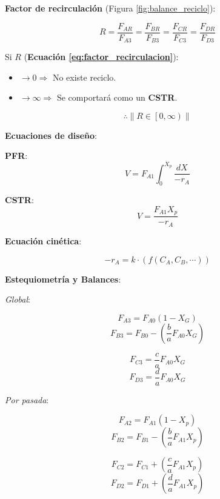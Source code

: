     \textbf{Factor de recirculación} (Figura \ref{fig:balance_reciclo}):
    
    \begin{equation}
    \label{eq:factor_recirculacion}
        R = \frac{F_{AR}}{F_{A3}} = \frac{F_{BR}}{F_{B3}} = \frac{F_{CR}}{F_{C3}} = \frac{F_{DR}}{F_{D3}}
    \end{equation}
    
    Si \(R\) (\textbf{Ecuación \ref{eq:factor_recirculacion}}):
    \begin{itemize}
        \item \( \rightarrow 0 \Rightarrow \) No existe reciclo.
        \item \( \rightarrow \infty \Rightarrow \) Se comportará como un \textbf{CSTR}.
    \end{itemize}
    
    \[\therefore \left \| R \in \left [ 0, \infty \right ) \right \| \]
    
    \textbf{Ecuaciones de diseño}:
    
    \begin{multicols}{2}
        \textbf{PFR}:
        \[V = F_{A1} \int_{0}^{X_{p}} \frac{dX}{-r_{A}}\]
        
        \textbf{CSTR}:
        \[V = \frac{F_{A1} X_{p}}{-r_{A}}\]
    \end{multicols}
    
    \textbf{Ecuación cinética}:
    
    \[-r_{A} = k \cdot \left ( f \left ( C_{A}, C_{B}, \cdots \right ) \right )\]
    
    \textbf{Estequiometría y Balances}:
    
    \textit{Global}:
    \begin{multicols}{2}
        \[F_{A3} = F_{A0} \left ( 1 - X_{G} \right )\]
        \[F_{B3} = F_{B0} - \left (\frac{b}{a} F_{A0} X_{G} \right )\]
        
        \[F_{C3} = \frac{c}{a} F_{A0}X_{G}\]
        \[F_{D3} = \frac{d}{a} F_{A0}X_{G}\]
        
    \end{multicols}
    
    \textit{Por pasada}:
    \begin{multicols}{2}
        \[F_{A2} = F_{A1} \left ( 1 - X_{p} \right )\]
        \[F_{B2} = F_{B1} - \left (\frac{b}{a} F_{A1} X_{p} \right )\]
        
        \[F_{C2} = F_{C1} + \left (\frac{c}{a} F_{A1}X_{p} \right )\]
        \[F_{D2} = F_{D1} + \left (\frac{d}{a} F_{A1}X_{p} \right )\]
        
    \end{multicols}
    

